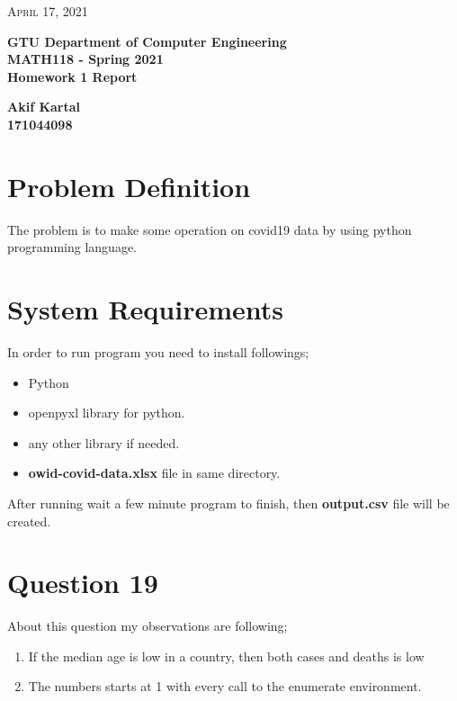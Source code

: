 \documentclass{article}
\begin{document}
\begin{titlepage}

	\begin{flushright}
	\textsc{\large April 17, 2021} \\
	\end{flushright}
	\begin{center}
	\Large{\bfseries GTU Department of Computer Engineering \\ MATH118 - Spring 2021 \\ Homework 1 Report  } \\
	\end{center}
	\vspace*{\fill}
	\begin{center}
	\Large{\bfseries Akif Kartal \\ 171044098 }
	\end{center}
	\vspace*{\fill}

\end{titlepage}

\cleardoublepage
\section{Problem Definition}
The problem is to make some operation on covid19 data by using python programming language.
\section{System Requirements}
In order to run program you need to install followings;
\begin{itemize}
	\item Python
	\item openpyxl library for python.
	\item any other library if needed.
	\item \textbf{owid-covid-data.xlsx} file in same directory.
\end{itemize} 
After running wait a few minute program to finish, then \textbf{output.csv} file will be created.
\section{Question 19}
About this question my observations are following;
\begin{enumerate}
  \item If the median age is low in a country, then both cases and deaths is low
  \item The numbers starts at 1 with every call to the enumerate environment.
\end{enumerate}
\end{document}
